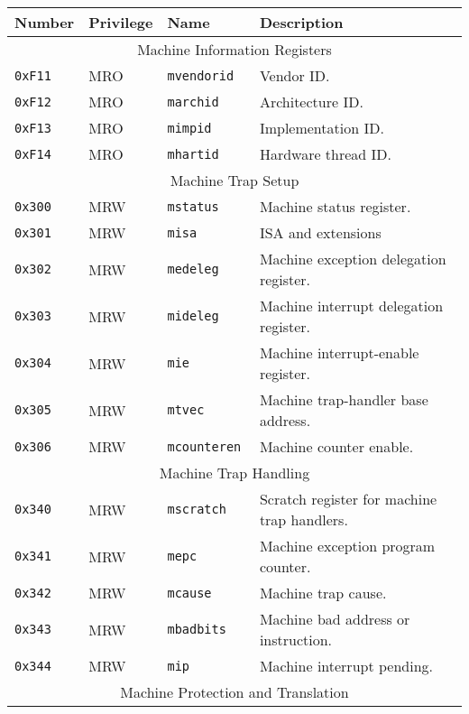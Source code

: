 \begin{table}[htb!]
\begin{center}
\begin{tabular}{|l|l|l|l|}
\hline
Number    & Privilege & Name & Description \\
\hline  
\multicolumn{4}{|c|}{Machine Information Registers} \\
\hline
\tt 0xF11 & MRO &\tt mvendorid   & Vendor ID. \\
\tt 0xF12 & MRO &\tt marchid     & Architecture ID. \\
\tt 0xF13 & MRO &\tt mimpid      & Implementation ID. \\
\tt 0xF14 & MRO &\tt mhartid     & Hardware thread ID. \\
\hline  
\multicolumn{4}{|c|}{Machine Trap Setup} \\
\hline
\tt 0x300 & MRW  &\tt mstatus    & Machine status register. \\
\tt 0x301 & MRW  &\tt misa       & ISA and extensions \\
\tt 0x302 & MRW  &\tt medeleg    & Machine exception delegation register. \\
\tt 0x303 & MRW  &\tt mideleg    & Machine interrupt delegation register. \\
\tt 0x304 & MRW  &\tt mie        & Machine interrupt-enable register. \\
\tt 0x305 & MRW  &\tt mtvec      & Machine trap-handler base address. \\
\tt 0x306 & MRW  &\tt mcounteren & Machine counter enable. \\
\hline
\multicolumn{4}{|c|}{Machine Trap Handling} \\
\hline
\tt 0x340 & MRW  &\tt mscratch   & Scratch register for machine trap handlers. \\
\tt 0x341 & MRW  &\tt mepc       & Machine exception program counter. \\
\tt 0x342 & MRW  &\tt mcause     & Machine trap cause. \\
\tt 0x343 & MRW  &\tt mbadbits   & Machine bad address or instruction. \\
\tt 0x344 & MRW  &\tt mip        & Machine interrupt pending. \\
\hline
\multicolumn{4}{|c|}{Machine Protection and Translation} \\
\hline

\end{tabular}
\end{center}
\end{table}
